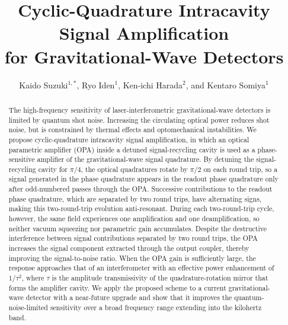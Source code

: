 \documentclass{iopjournal}
\begin{document}

\title{Cyclic-Quadrature Intracavity Signal Amplification \\for Gravitational-Wave Detectors}

\author{Kaido Suzuki$^{1,*}$, Ryo Iden$^1$, Ken-ichi Harada$^2$, and Kentaro Somiya$^{1}$}






\begin{abstract}
The high-frequency sensitivity of laser-interferometric gravitational-wave detectors is limited by quantum shot noise. Increasing the circulating optical power reduces shot noise, but is constrained by thermal effects and optomechanical instabilities. We propose cyclic-quadrature intracavity signal amplification, in which an optical parametric amplifier (OPA) inside a detuned signal-recycling cavity is used as a phase-sensitive amplifier of the gravitational-wave signal quadrature.
By detuning the signal-recycling cavity for \(\pi/4\), the optical quadratures rotate by \(\pi/2\) on each round trip, so a signal generated in the phase quadrature appears in the readout phase quadrature only after odd-numbered passes through the OPA. Successive contributions to the readout phase quadrature, which are separated by two round trips, have alternating signs, making this two-round-trip evolution anti-resonant. During each two-round-trip cycle, however, the same field experiences one amplification and one deamplification, so neither vacuum squeezing nor parametric gain accumulates. Despite the destructive interference between signal contributions separated by two round trips, the OPA increases the signal component extracted through the output coupler, thereby improving the signal-to-noise ratio.
When the OPA gain is sufficiently large, the response approaches that of an interferometer with an effective power enhancement of \(1/\tau^2\), where \(\tau\) is the amplitude transmissivity of the quadrature-rotation mirror that forms the amplifier cavity.
We apply the proposed scheme to a current gravitational-wave detector with a near-future upgrade and show that it improves the quantum-noise-limited sensitivity over a broad frequency range extending into the kilohertz band.
\end{abstract}
\end{document}
